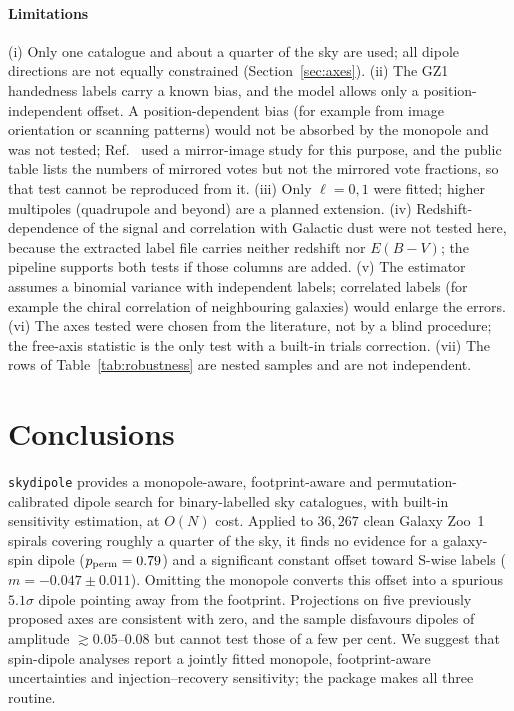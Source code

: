 \documentclass[preprint,12pt]{elsarticle}
\begin{document}
\paragraph{Limitations}
(i) Only one catalogue and about a quarter of the sky are used; all dipole directions are not equally constrained (Section~\ref{sec:axes}).
(ii) The GZ1 handedness labels carry a known bias, and the model allows only a position-independent offset.
A position-dependent bias (for example from image orientation or scanning patterns) would not be absorbed by the monopole and was not tested; Ref.~\cite{Land2008} used a mirror-image study for this purpose, and the public table lists the numbers of mirrored votes but not the mirrored vote fractions, so that test cannot be reproduced from it.
(iii) Only $\ell=0,1$ were fitted; higher multipoles (quadrupole and beyond) are a planned extension.
(iv) Redshift-dependence of the signal and correlation with Galactic dust were not tested here, because the extracted label file carries neither redshift nor $E(B{-}V)$; the pipeline supports both tests if those columns are added.
(v) The estimator assumes a binomial variance with independent labels; correlated labels (for example the chiral correlation of neighbouring galaxies) would enlarge the errors.
(vi) The axes tested were chosen from the literature, not by a blind procedure; the free-axis statistic is the only test with a built-in trials correction.
(vii) The rows of Table~\ref{tab:robustness} are nested samples and are not independent.

\section{Conclusions}
\label{sec:conclusions}

\texttt{skydipole} provides a monopole-aware, footprint-aware and permutation-calibrated dipole search for binary-labelled sky catalogues, with built-in sensitivity estimation, at $O(N)$ cost.
Applied to $36{,}267$ clean Galaxy Zoo~1 spirals covering roughly a quarter of the sky, it finds no evidence for a galaxy-spin dipole ($p_{\rm perm} = 0.79$) and a significant constant offset toward S-wise labels ($m = -0.047\pm0.011$).
Omitting the monopole converts this offset into a spurious $5.1\sigma$ dipole pointing away from the footprint.
Projections on five previously proposed axes are consistent with zero, and the sample disfavours dipoles of amplitude $\gtrsim0.05$--$0.08$ but cannot test those of a few per cent.
We suggest that spin-dipole analyses report a jointly fitted monopole, footprint-aware uncertainties and injection--recovery sensitivity; the package makes all three routine.
\end{document}
